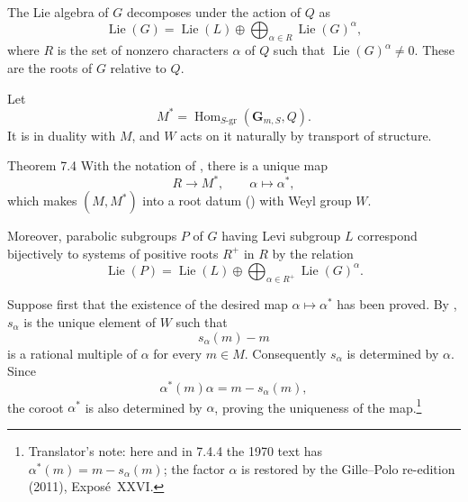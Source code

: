 
The Lie algebra of \(G\) decomposes under the action of \(Q\) as
\[
 \operatorname{Lie}(G)
 =\operatorname{Lie}(L)
  \oplus\bigoplus_{\alpha\in R}\operatorname{Lie}(G)^\alpha,
\]
where \(R\) is the set of nonzero characters \(\alpha\) of \(Q\)
such that \(\operatorname{Lie}(G)^\alpha\ne0\).  These are the roots
of \(G\) relative to \(Q\).

Let
\[
 M^*=\operatorname{Hom}_{S\text{-}\mathrm{gr}}
       (\mathbf G_{m,S},Q).
\]
It is in duality with \(M\), and \(W\) acts on it naturally by
transport of structure.

\begin{sgastatement}{Theorem 7.4}
With the notation of , there is a unique map
\[
 R\longrightarrow M^*,\qquad \alpha\longmapsto\alpha^*,
\]
which makes \((M,M^*)\) into a root datum \textup{()} with Weyl group \(W\).

Moreover, parabolic subgroups \(P\) of \(G\) having Levi subgroup
\(L\) correspond bijectively to systems of positive roots \(R^+\)
in \(R\) by the relation
\[
 \operatorname{Lie}(P)
 =\operatorname{Lie}(L)
  \oplus\bigoplus_{\alpha\in R^+}\operatorname{Lie}(G)^\alpha.
\]
\end{sgastatement}


Suppose first that the existence of the desired map
\(\alpha\mapsto\alpha^*\) has been proved.  By ,
\(s_\alpha\) is the unique element of \(W\) such that
\[
 s_\alpha(m)-m
\]
is a rational multiple of \(\alpha\) for every \(m\in M\).
Consequently \(s_\alpha\) is determined by \(\alpha\).  Since
\[
 \alpha^*(m)\alpha=m-s_\alpha(m),
\]
the coroot \(\alpha^*\) is also determined by \(\alpha\), proving
the uniqueness of the map.\footnote{Translator's note: here and in 7.4.4 the 1970 text has
\(\alpha^*(m)=m-s_\alpha(m)\); the factor \(\alpha\) is restored by the
Gille--Polo re-edition (2011), Exposé~XXVI.}


